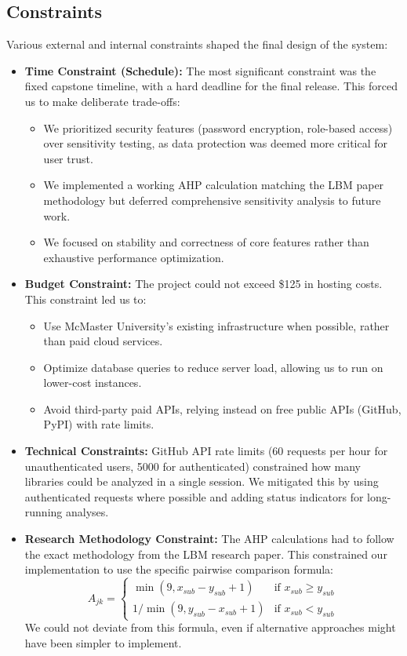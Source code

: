 \documentclass{article}
\begin{document}
\subsection{Constraints}

Various external and internal constraints shaped the final design of the system:

\begin{itemize}
  \item \textbf{Time Constraint (Schedule):} The most significant constraint was the fixed capstone timeline, with a hard deadline for the final release. This forced us to make deliberate trade-offs:
  \begin{itemize}
    \item We prioritized security features (password encryption, role-based access) over sensitivity testing, as data protection was deemed more critical for user trust.
    \item We implemented a working AHP calculation matching the LBM paper methodology but deferred comprehensive sensitivity analysis to future work.
    \item We focused on stability and correctness of core features rather than exhaustive performance optimization.
  \end{itemize}

  \item \textbf{Budget Constraint:} The project could not exceed \$125 in hosting costs. This constraint led us to:
  \begin{itemize}
    \item Use McMaster University's existing infrastructure when possible, rather than paid cloud services.
    \item Optimize database queries to reduce server load, allowing us to run on lower-cost instances.
    \item Avoid third-party paid APIs, relying instead on free public APIs (GitHub, PyPI) with rate limits.
  \end{itemize}

  \item \textbf{Technical Constraints:} GitHub API rate limits (60 requests per hour for unauthenticated users, 5000 for authenticated) constrained how many libraries could be analyzed in a single session. We mitigated this by using authenticated requests where possible and adding status indicators for long-running analyses.

  \item \textbf{Research Methodology Constraint:} The AHP calculations had to follow the exact methodology from the LBM research paper. This constrained our implementation to use the specific pairwise comparison formula:
  \[
  A_{jk} =
  \begin{cases}
  \min(9, x_{sub} - y_{sub} + 1) & \text{if } x_{sub} \geq y_{sub} \\
  1 / \min(9, y_{sub} - x_{sub} + 1) & \text{if } x_{sub} < y_{sub}
  \end{cases}
  \]
  We could not deviate from this formula, even if alternative approaches might have been simpler to implement.


\end{itemize}
\end{document}
